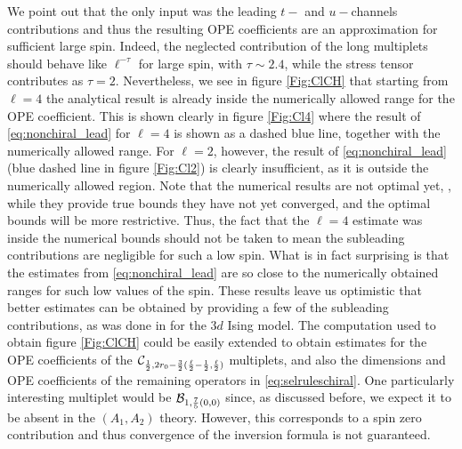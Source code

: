 We point out that the only input was the leading $t-$ and $u-$channels contributions and thus the resulting OPE coefficients are an approximation for sufficient large spin. Indeed, the neglected contribution of the long multiplets should behave like $\ell^{-\tau}$ for large spin, with $\tau \sim 2.4$, while the stress tensor contributes as $\tau=2$. Nevertheless, we see in figure \ref{Fig:ClCH} that starting from $\ell=4$ the analytical result is already inside the numerically allowed range for the OPE coefficient. This is shown clearly in figure \ref{Fig:Cl4} where the result of \eqref{eq:nonchiral_lead} for $\ell=4$ is shown as a dashed blue line, together with the numerically allowed range. For $\ell=2$, however, the result of \eqref{eq:nonchiral_lead} (blue dashed line in figure \ref{Fig:Cl2}) is clearly insufficient, as it is outside the numerically allowed region.
Note that the numerical results are not optimal yet, \ie, while they provide true bounds they have not yet converged, and the optimal bounds will be more restrictive. Thus, the fact that the $\ell=4$ estimate was inside the numerical bounds should not be taken to mean the subleading contributions are negligible for such a low spin. What is in fact surprising is that the estimates from \eqref{eq:nonchiral_lead} are so close to the numerically obtained ranges for such low values of the spin. These results leave us optimistic that better estimates can be obtained by providing a few of the subleading contributions, as was done in \cite{Simmons-Duffin:2016wlq} for the $3d$ Ising model.
The computation used to obtain figure \ref{Fig:ClCH} could be easily extended to obtain estimates for the OPE coefficients of the 
${\mathcal{C}}_{\frac12, 2r_0- \frac32 (\frac{\ell}2-\frac12,\frac{\ell}2)}$  multiplets, and also the dimensions and OPE coefficients of the remaining operators in \eqref{eq:selruleschiral}. One particularly interesting multiplet would be ${\mathcal{B}}_{1, \frac75 (0,0)}$ since, as discussed before, we expect it to be absent in the $(A_1,A_2)$ theory. However, this corresponds to a spin zero contribution and thus convergence of the inversion formula is not guaranteed.
